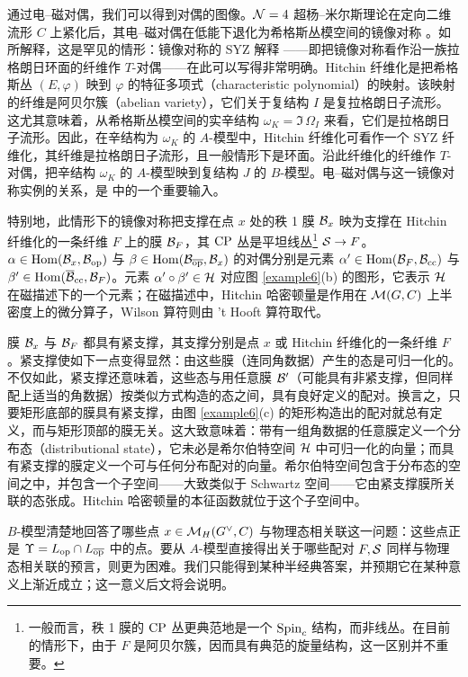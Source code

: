 通过电–磁对偶，我们可以得到对偶的图像。$\N=4$ 超杨–米尔斯理论在定向二维流形 $C$ 上紧化后，其电–磁对偶在低能下退化为希格斯丛模空间的镜像对称 \cite{BJSV,JWS}。如 \cite{HT} 所解释，这是罕见的情形：镜像对称的 SYZ 解释 \cite{SYZ}——即把镜像对称看作沿一族拉格朗日环面的纤维作 $T$-对偶——在此可以写得非常明确。Hitchin 纤维化是把希格斯丛 $(E,\varphi)$ 映到 $\varphi$ 的特征多项式（characteristic polynomial）的映射。该映射的纤维是阿贝尔簇（abelian variety），它们关于复结构 $I$ 是复拉格朗日子流形。这尤其意味着，从希格斯丛模空间的实辛结构 $\omega_K=\Im\,\Omega_I$ 来看，它们是拉格朗日子流形。因此，在辛结构为 $\omega_K$ 的 $A$-模型中，Hitchin 纤维化可看作一个 SYZ 纤维化，其纤维是拉格朗日子流形，且一般情形下是环面。沿此纤维化的纤维作 $T$-对偶，把辛结构 $\omega_K$ 的 $A$-模型映到复结构 $J$ 的 $B$-模型。电–磁对偶与这一镜像对称实例的关系，是 \cite{KW} 中的一个重要输入。

特别地，此情形下的镜像对称把支撑在点 $x$ 处的秩 1 膜 $\B_x$ 映为支撑在 Hitchin 纤维化的一条纤维 $F$ 上的膜 $\B_F$，其 $\CP$ 丛是平坦线丛\footnote{\label{canon}一般而言，秩 1 膜的 $\CP$ 丛更典范地是一个 $\Spinc$ 结构，而非线丛。在目前的情形下，由于 $F$ 是阿贝尔簇，因而具有典范的旋量结构，这一区别并不重要。} $\S\to F$。$\alpha\in \Hom(\B_x,\B_\op)$ 与 $\beta\in\Hom(\B_\bop,\B_x)$ 的对偶分别是元素 $\alpha'\in \Hom(\B_F,\B_\cc)$ 与 $\beta'\in \Hom(\b\B_\cc,\B_F)$。元素 $\alpha'\circ\beta'\in \H$ 对应图 \ref{example6}(b) 的图形，它表示 $\H$ 在磁描述下的一个元素；在磁描述中，Hitchin 哈密顿量是作用在 $\M(G,C)$ 上半密度上的微分算子，Wilson 算符则由 't Hooft 算符取代。

膜 $\B_x$ 与 $\B_F$ 都具有紧支撑，其支撑分别是点 $x$ 或 Hitchin 纤维化的一条纤维 $F$。紧支撑使如下一点变得显然：由这些膜（连同角数据）产生的态是可归一化的。不仅如此，紧支撑还意味着，这些态与用任意膜 $\B'$（可能具有非紧支撑，但同样配上适当的角数据）按类似方式构造的态之间，具有良好定义的配对。换言之，只要矩形底部的膜具有紧支撑，由图 \ref{example6}(c) 的矩形构造出的配对就总有定义，而与矩形顶部的膜无关。这大致意味着：带有一组角数据的任意膜定义一个分布态（distributional state），它未必是希尔伯特空间 $\H$ 中可归一化的向量；而具有紧支撑的膜定义一个可与任何分布配对的向量。希尔伯特空间包含于分布态的空间之中，并包含一个子空间——大致类似于 Schwartz 空间——它由紧支撑膜所关联的态张成。Hitchin 哈密顿量的本征函数就位于这个子空间中。

$B$-模型清楚地回答了哪些点 $x\in \M_H(G^\vee,C)$ 与物理态相关联这一问题：这些点正是 $\Upsilon=L_\op\cap L_\bop$ 中的点。要从 $A$-模型直接得出关于哪些配对 $F,\S$ 同样与物理态相关联的预言，则更为困难。我们只能得到某种半经典答案，并预期它在某种意义上渐近成立；这一意义后文将会说明。

